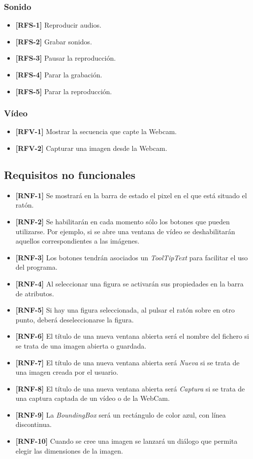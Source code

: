 \subsubsection{Sonido}
\begin{itemize}
\item{\textbf{[RFS-1]} Reproducir audios.}
\item{\textbf{[RFS-2]} Grabar sonidos.}
\item{\textbf{[RFS-3]} Pausar la reproducción.}
\item{\textbf{[RFS-4]} Parar la grabación.}
\item{\textbf{[RFS-5]} Parar la reproducción.}
\end{itemize}
\subsubsection{Vídeo}
\begin{itemize}
\item{\textbf{[RFV-1]} Mostrar la secuencia que capte la Webcam.}
\item{\textbf{[RFV-2]} Capturar una imagen desde la Webcam.}
\end{itemize}
\subsection{Requisitos no funcionales}
\begin{itemize}
\item{\textbf{[RNF-1]} Se mostrará en la barra de estado el pixel en el que está situado el ratón.}
\item{\textbf{[RNF-2]} Se habilitarán en cada momento sólo los botones que pueden utilizarse. Por ejemplo, si se abre una ventana de vídeo se deshabilitarán aquellos correspondientes a las imágenes.}
\item{\textbf{[RNF-3]} Los botones tendrán asociados un \textit{ToolTipText} para facilitar el uso del programa.}
\item{\textbf{[RNF-4]} Al seleccionar una figura se activarán sus propiedades en la barra de atributos.}
\item{\textbf{[RNF-5]} Si hay una figura seleccionada, al pulsar el ratón sobre en otro punto, deberá deseleccionarse la figura.}
\item{\textbf{[RNF-6]} El título de una nueva ventana abierta será el nombre del fichero si se trata de una imagen abierta o guardada.}
\item{\textbf{[RNF-7]} El título de una nueva ventana abierta será \textit{Nueva} si se trata de una imagen creada por el usuario.}
\item{\textbf{[RNF-8]} El título de una nueva ventana abierta será \textit{Captura} si se trata de una captura captada de un vídeo o de la WebCam.}
\item{\textbf{[RNF-9]} La \textit{BoundingBox} será un rectángulo de color azul, con línea discontinua.}
\item{\textbf{[RNF-10]} Cuando se cree una imagen se lanzará un diálogo que permita elegir las dimensiones de la imagen.}

\end{itemize}

